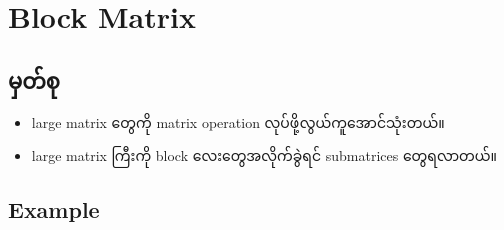 \section{Block Matrix}
\subsection{မှတ်စု}
\begin{itemize}
    \item large matrix တွေကို matrix operation လုပ်ဖို့လွယ်ကူအောင်သုံးတယ်။
    \item large matrix ကြီးကို block လေးတွေအလိုက်ခွဲရင် submatrices တွေရလာတယ်။
\end{itemize}
\subsection{Example}
